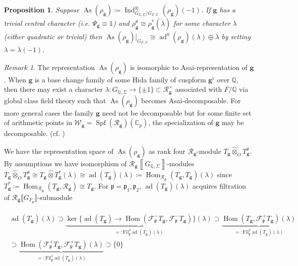 \documentclass[10pt]{amsart}
\numberwithin{equation}{section}
\newtheorem{prop}[thm]{Proposition}
\theoremstyle{definition}
\theoremstyle{remark} %
\newtheorem{rmk}[thm]{Remark}
\newcommand{\bb}{\mathbb}
\newcommand{\bbox}[1]{\left\llbracket#1\right\rrbracket}
\newcommand{\ad}{\operatorname{ad}}
\newcommand{\As}{\operatorname{As}}
\newcommand{\Hom}{\operatorname{Hom}}
\newcommand{\Ind}{\operatorname{Ind}}
\newcommand{\scrF}{\mathscr{F}}
\newcommand{\g}{\mathbf{g}}
\newcommand{\p}{\mathfrak{p}}
\newcommand{\Q}{\mathbb{Q}}
\newcommand{\R}{\mathcal{R}}
\newcommand{\W}{\mathcal{W}}
\begin{document}
	\begin{prop}
		\label{prop : Asai_decomposition}
		Suppose $ \As(\rho_\g)\coloneqq  \Ind^{\otimes}_{G_{\Q, \Sigma}/G_{F, \Sigma}}{}^{}(\rho_\g)(-1) $. If $ \g $ has a trivial central character (i.e. $ \Psi_{\g} \equiv \mathds{1} $) and $ \rho_{\g}^{\theta} \cong \rho_{\g}^* (\dot{\lambda}) $ for some character $ \dot{\lambda} $ (either quadratic or trivial) then $ \As(\rho_\g)|_{G_{F, \Sigma}} \cong \ad^0(\rho_\g)(\lambda) \oplus \lambda$ by setting $ \lambda = \dot{\lambda}(-1) $.
	\end{prop}
	\begin{rmk}
		The representation $ \As(\rho_\g)$ is isomorphic to Asai-representation of $ \g $. When $ \g $ is a base change family of some Hida family of cuspform $ \g^\flat $ over $ \Q $, then there may exist a character $ \lambda \colon G_{\Q, \Sigma} \rightarrow \{\pm 1\} \subset \R_{\g}^\times$ associated with $ F/\Q $ via global class field theory such that $  \As(\rho_\g) $ becomes Asai-decomposable. For more general cases the family $ \g $ need not be decomposable but for some finite set of arithmetic points in $ \W_{\g}= \operatorname{Spf}(\R_\g)(\bb{C}_p) $, the specialization of $ \g $ may be decomposable. (cf. \cite[Section 3.2]{Liu16})
	\end{rmk}
	We have the representation space of $ \As(\rho_\g) $ as rank four $ \R_{\g} $-module $ T_\g \widehat{\otimes}_{O} T_\g^\theta$. By assumptions we have isomorphism of $ \R_{\g}\bbox{G_{\Q,\Sigma}} $-modules  $T_\g \widehat{\otimes}_{O} T_\g^\theta \cong T_\g \widehat{\otimes} T_\g^*(\lambda) \cong \ad(T_\g)(\lambda)\coloneqq\Hom_{\R_{\g}}(T_\g,T_\g)(\lambda) $ since $ T_\g^* \coloneqq \Hom_{\R_\g}(T_\g, \R_{\g}) \cong T_\g $. For $ \p =\p_1, \p_2 $,
	$ \ad(T_\g)(\lambda) $ acquires filtration of $ \R_{\g}\llbracket G_{F_{\p}}\rrbracket $-submodule
	
	\begin{align}
		\begin{aligned}
			\ad(T_\g)(\lambda) \supset \underbrace{\ker\{\ad(T_\g) \rightarrow \Hom(\scrF^{-}_{\p} T_\g , \scrF^{-}_{\p} T_\g)\}(\lambda)}_{=:\mathrm{Fil}^3_{\p}\ad(T_\g)(\lambda)} \supset \underbrace{\Hom(T_\g,\scrF^{+}_{\p} T_\g)(\lambda)}_{=:\mathrm{Fil}^2_{\p}\ad(T_\g)(\lambda)} \qquad \qquad \qquad \\ 
			\supset \underbrace{\Hom(\scrF^{+}_{\p} T_\g,\scrF^{+}_{\p} T_\g)(\lambda)}_{=:\mathrm{Fil}^1_{\p}\ad(T_\g)(\lambda)} \supset \{0\}
		\end{aligned}
	\end{align}
	
\end{document}
